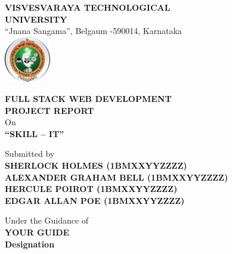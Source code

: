 
\begin{titlepage}
	\thispagestyle{empty}
    \centering
    
    \textbf{
    {\large VISVESVARAYA TECHNOLOGICAL}\\[0.5em]
    {\large UNIVERSITY}}\\[0.5em]
    {\large “Jnana Sangama”, Belgaum -590014, Karnataka} \\
    
    \vspace*{0.5cm}
    \includegraphics[width=0.15\textwidth]{vtu.png} \\

    \vspace{0.5cm}
    
    {\large \textbf{FULL STACK WEB DEVELOPMENT}}\\[0.5em]
    {\large \textbf{PROJECT REPORT}} \\
    \vspace{0.25cm}
    {\large On} \\
    \vspace{0.5cm}
    {\Large \textbf{“SKILL – IT”}} \\
    
    \vspace{0.5cm}
    
    {\large Submitted by} \\
    \vspace{0.5cm}
    \textbf{
    {\large SHERLOCK HOLMES (1BMXXYYZZZZ)} \\
    {\large ALEXANDER GRAHAM BELL (1BMXXYYZZZZ)} \\
    {\large HERCULE POIROT (1BMXXYYZZZZ)} \\
    {\large EDGAR ALLAN POE (1BMXXYYZZZZ)} \\
    }
    \vspace{0.75cm}
    
    {\large Under the Guidance of} \\
    \textbf{
    {\large YOUR GUIDE}\\
    {\large Designation} \\
    }
    \vspace{0.5cm}
    

\end{titlepage}
